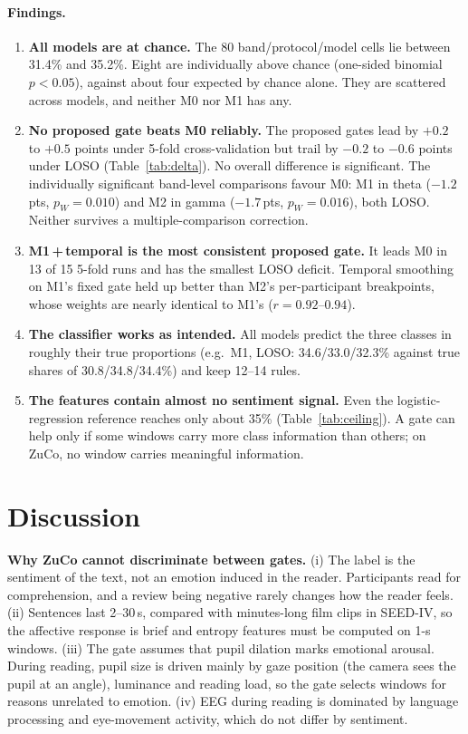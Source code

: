 \documentclass[10pt,a4paper]{article}
\newcommand{\pts}{\,pts}
\begin{document}
\paragraph{Findings.}
\begin{enumerate}
  \item \textbf{All models are at chance.} The 80 band/protocol/model cells lie between 31.4\% and 35.2\%. Eight are individually above chance (one-sided binomial $p<0.05$), against about four expected by chance alone. They are scattered across models, and neither M0 nor M1 has any.
  \item \textbf{No proposed gate beats M0 reliably.} The proposed gates lead by $+0.2$ to $+0.5$ points under 5-fold cross-validation but trail by $-0.2$ to $-0.6$ points under LOSO (Table~\ref{tab:delta}). No overall difference is significant. The individually significant band-level comparisons favour M0: M1 in theta ($-1.2$\pts, $p_W{=}0.010$) and M2 in gamma ($-1.7$\pts, $p_W{=}0.016$), both LOSO. Neither survives a multiple-comparison correction.
  \item \textbf{M1\,+\,temporal is the most consistent proposed gate.} It leads M0 in 13 of 15 5-fold runs and has the smallest LOSO deficit. Temporal smoothing on M1's fixed gate held up better than M2's per-participant breakpoints, whose weights are nearly identical to M1's ($r{=}0.92$--$0.94$).
  \item \textbf{The classifier works as intended.} All models predict the three classes in roughly their true proportions (e.g.\ M1, LOSO: 34.6/33.0/32.3\% against true shares of 30.8/34.8/34.4\%) and keep 12--14 rules.
  \item \textbf{The features contain almost no sentiment signal.} Even the logistic-regression reference reaches only about 35\% (Table~\ref{tab:ceiling}). A gate can help only if some windows carry more class information than others; on ZuCo, no window carries meaningful information.
\end{enumerate}

\section{Discussion}
\textbf{Why ZuCo cannot discriminate between gates.} (i) The label is the sentiment of the text, not an emotion induced in the reader. Participants read for comprehension, and a review being negative rarely changes how the reader feels. (ii) Sentences last 2--30\,s, compared with minutes-long film clips in SEED-IV, so the affective response is brief and entropy features must be computed on 1-s windows. (iii) The gate assumes that pupil dilation marks emotional arousal. During reading, pupil size is driven mainly by gaze position (the camera sees the pupil at an angle), luminance and reading load, so the gate selects windows for reasons unrelated to emotion. (iv) EEG during reading is dominated by language processing and eye-movement activity, which do not differ by sentiment.
\end{document}
